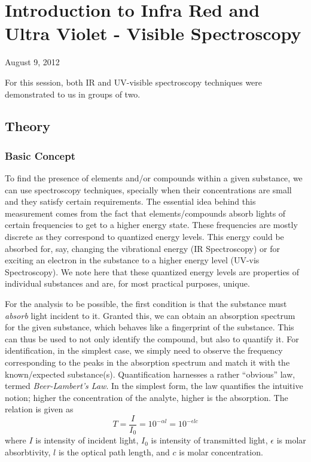 \chapter{Introduction to Infra Red and Ultra Violet - Visible Spectroscopy}
\begin{flushright}
August 9, 2012
\end{flushright}

For this session, both IR and UV-visible spectroscopy techniques were demonstrated to us in groups of two.

\section{Theory}
\subsection {Basic Concept}
To find the presence of elements and/or compounds within a given substance, we can use spectroscopy techniques, specially when their concentrations are small and they satisfy certain requirements. The essential idea behind this measurement comes from the fact that elements/compounds absorb lights of certain frequencies to get to a higher energy state. These frequencies are mostly discrete as they correspond to quantized energy levels. This energy could be absorbed for, say, changing the vibrational energy (IR Spectroscopy) or for exciting an electron in the substance to a higher energy level (UV-vis Spectroscopy). We note here that these quantized energy levels are properties of individual substances and are, for most practical purposes, unique.
\par
For the analysis to be possible, the first condition is that the substance must \emph{absorb} light incident to it.  Granted this, we can obtain an absorption spectrum for the given substance, which behaves like a fingerprint of the substance. This can thus be used to not only identify the compound, but also to quantify it. For identification, in the simplest case, we simply need to observe the frequency corresponding to the peaks in the absorption spectrum and match it with the known/expected substance(s). Quantification harnesses a rather ``obvious'' law, termed \emph{Beer-Lambert's Law}. In the simplest form, the law quantifies the intuitive notion; higher the concentration of the analyte, higher is the absorption. The relation is given as
\begin{equation}
T=\frac{I}{I_{0}}=10^{-\alpha l}=10^{- \epsilon l c}
\label{beerlambertslaw}
\end{equation}
where $I$ is intensity of incident light, $I_{0}$ is intensity of transmitted light, $\epsilon$ is molar absorbtivity, $l$ is the optical path length, and $c$ is molar concentration.

